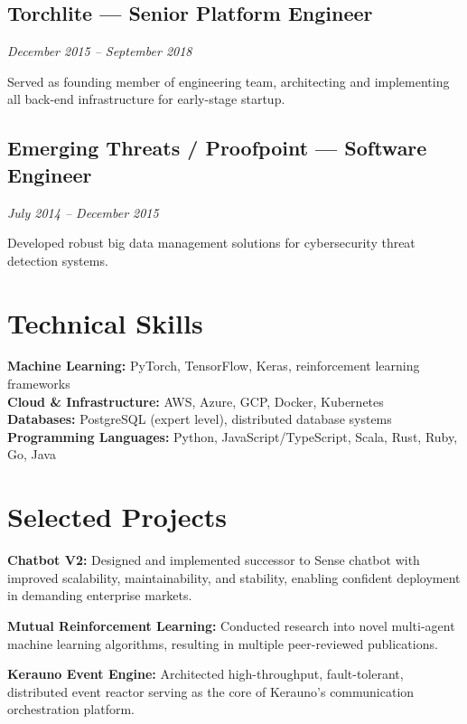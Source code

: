 \documentclass[11pt,letterpaper]{article}
\newcommand{\job}[4]{%
	\subsection{#1 --- #2}
	\textit{#3}

	#4

	\vspace{0.1in}
}
\begin{document}
\job{Torchlite}{Senior Platform Engineer}{December 2015 -- September 2018}{Served as founding member of engineering team, architecting and implementing all back-end infrastructure for early-stage startup.}

\job{Emerging Threats / Proofpoint}{Software Engineer}{July 2014 -- December 2015}{Developed robust big data management solutions for cybersecurity threat detection systems.}

\section{Technical Skills}

\textbf{Machine Learning:} PyTorch, TensorFlow, Keras, reinforcement learning frameworks \\[0.05in]
\textbf{Cloud \& Infrastructure:} AWS, Azure, GCP, Docker, Kubernetes \\[0.05in]
\textbf{Databases:} PostgreSQL (expert level), distributed database systems \\[0.05in]
\textbf{Programming Languages:} Python, JavaScript/TypeScript, Scala, Rust, Ruby, Go, Java

\section{Selected Projects}

\textbf{Chatbot V2:} Designed and implemented successor to Sense chatbot with improved scalability, maintainability, and stability, enabling confident deployment in demanding enterprise markets.

\vspace{0.1in}

\textbf{Mutual Reinforcement Learning:} Conducted research into novel multi-agent machine learning algorithms, resulting in multiple peer-reviewed publications.

\vspace{0.1in}

\textbf{Kerauno Event Engine:} Architected high-throughput, fault-tolerant, distributed event reactor serving as the core of Kerauno's communication orchestration platform.
\end{document}
